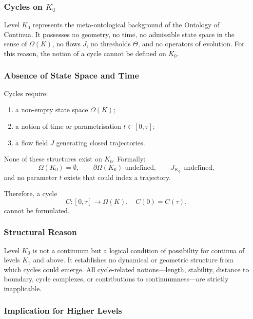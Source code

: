 
\subsubsection{Cycles on \texorpdfstring{$K_0$}{K_0}}
\label{sec:cycles-k0}

Level $K_0$ represents the meta-ontological background of the
Ontology of Continua.
It possesses no geometry, no time, no admissible state space in the
sense of $\Omega(K)$, no flows $J$, no thresholds $\Theta$, and no
operators of evolution.
For this reason, the notion of a cycle cannot be defined on $K_0$.

\subsubsection{Absence of State Space and Time}

Cycles require:
\begin{enumerate}
  \item a non-empty state space $\Omega(K)$;
  \item a notion of time or parametrisation $t\in[0,\tau]$;
  \item a flow field $J$ generating closed trajectories.
\end{enumerate}

None of these structures exist on $K_0$.
Formally:
\[
  \Omega(K_0)=\emptyset, \qquad
  \partial\Omega(K_0) \text{ undefined}, \qquad
  J_{K_0} \text{ undefined},
\]
and no parameter $t$ exists that could index a trajectory.

Therefore, a cycle
\[
  C:[0,\tau]\to\Omega(K), \quad C(0)=C(\tau),
\]
cannot be formulated.

\subsubsection{Structural Reason}

Level $K_0$ is not a continuum but a logical condition of possibility
for continua of levels $K_1$ and above.
It establishes no dynamical or geometric structure from which cycles
could emerge.
All cycle-related notions---length, stability, distance to boundary,
cycle complexes, or contributions to continuumness---are strictly
inapplicable.

\subsubsection{Implication for Higher Levels}

